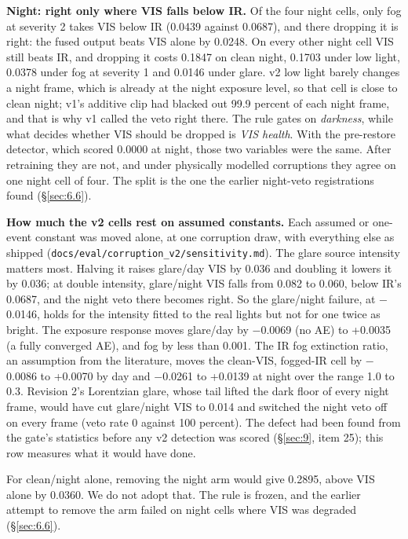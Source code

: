\documentclass[10pt]{article}
\begin{document}
\textbf{Night: right only where VIS falls below IR.} Of the four night cells, only fog at severity 2 takes VIS below IR (0.0439 against 0.0687), and there dropping it is right: the fused output beats VIS alone by 0.0248. On every other night cell VIS still beats IR, and dropping it costs 0.1847 on clean night, 0.1703 under low light, 0.0378 under fog at severity 1 and 0.0146 under glare. v2 low light barely changes a night frame, which is already at the night exposure level, so that cell is close to clean night; v1's additive clip had blacked out 99.9 percent of each night frame, and that is why v1 called the veto right there. The rule gates on \emph{darkness}, while what decides whether VIS should be dropped is \emph{VIS health}. With the pre-restore detector, which scored 0.0000 at night, those two variables were the same. After retraining they are not, and under physically modelled corruptions they agree on one night cell of four. The split is the one the earlier night-veto registrations found (\S\ref{sec:6.6}).

\textbf{How much the v2 cells rest on assumed constants.} Each assumed or one-event constant was moved alone, at one corruption draw, with everything else as shipped (\texttt{docs/\allowbreak{}eval/\allowbreak{}corruption\_\allowbreak{}v2/\allowbreak{}sensitivity.md}). The glare source intensity matters most. Halving it raises glare/day VIS by 0.036 and doubling it lowers it by 0.036; at double intensity, glare/night VIS falls from 0.082 to 0.060, below IR's 0.0687, and the night veto there becomes right. So the glare/night failure, at $-$0.0146, holds for the intensity fitted to the real lights but not for one twice as bright. The exposure response moves glare/day by $-$0.0069 (no AE) to +0.0035 (a fully converged AE), and fog by less than 0.001. The IR fog extinction ratio, an assumption from the literature, moves the clean-VIS, fogged-IR cell by $-$0.0086 to +0.0070 by day and $-$0.0261 to +0.0139 at night over the range 1.0 to 0.3. Revision 2's Lorentzian glare, whose tail lifted the dark floor of every night frame, would have cut glare/night VIS to 0.014 and switched the night veto off on every frame (veto rate 0 against 100 percent). The defect had been found from the gate's statistics before any v2 detection was scored (\S\ref{sec:9}, item 25); this row measures what it would have done.

For clean/night alone, removing the night arm would give 0.2895, above VIS alone by 0.0360. We do not adopt that. The rule is frozen, and the earlier attempt to remove the arm failed on night cells where VIS was degraded (\S\ref{sec:6.6}).
\end{document}
